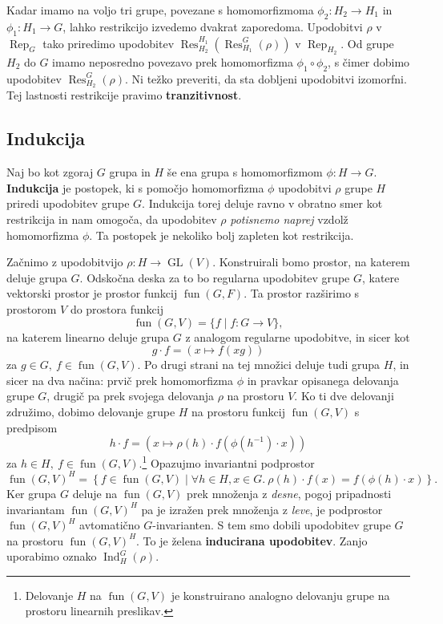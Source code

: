 \documentclass[11pt]{book}
\DeclareMathOperator\Res{Res}
\DeclareMathOperator\Ind{Ind}
\DeclareMathOperator\Rep{Rep}
\DeclareMathOperator\fun{fun}
\DeclareMathOperator\GL{GL}
\def\definicija{\color{rdeca}\bf}
\theoremstyle{definition}
\theoremstyle{zgled}
\theoremstyle{zgledbrezstevilke}
\theoremstyle{odprtproblem}
\theoremstyle{domacanaloga}
\theoremstyle{izrek}
\begin{document}
Kadar imamo na voljo tri grupe, povezane s homomorfizmoma $\phi_2 \colon H_2 \to H_1$ in $\phi_1 \colon H_1 \to G$, lahko restrikcijo izvedemo dvakrat zaporedoma. Upodobitvi $\rho$ v $\Rep_G$ tako priredimo upodobitev $\Res^{H_1}_{H_2}(\Res^G_{H_1}(\rho))$ v $\Rep_{H_2}$. Od grupe $H_2$ do $G$ imamo neposredno povezavo prek homomorfizma $\phi_1 \circ \phi_2$, s čimer dobimo upodobitev $\Res^G_{H_2}(\rho)$. Ni težko preveriti, da sta dobljeni upodobitvi izomorfni. Tej lastnosti restrikcije pravimo {\definicija tranzitivnost}.

\subsection{Indukcija}

Naj bo kot zgoraj $G$ grupa in $H$ še ena grupa s homomorfizmom $\phi \colon H \to G$. {\definicija Indukcija} je postopek, ki s pomočjo homomorfizma $\phi$ upodobitvi $\rho$ grupe $H$ priredi upodobitev grupe $G$. Indukcija torej deluje ravno v obratno smer kot restrikcija in nam omogoča, da upodobitev $\rho$ \emph{potisnemo naprej} vzdolž homomorfizma $\phi$. Ta postopek je nekoliko bolj zapleten kot restrikcija.

Začnimo z upodobitvijo $\rho \colon H \to \GL(V)$. Konstruirali bomo prostor, na katerem deluje grupa $G$. Odskočna deska za to bo regularna upodobitev grupe $G$, katere vektorski prostor je prostor funkcij $\fun(G,F)$. Ta prostor razširimo s prostorom $V$ do prostora funkcij
\[
    \fun(G,V) = \{ f \mid f \colon G \to V \},
\]
na katerem linearno deluje grupa $G$ z analogom regularne upodobitve, in sicer kot
\[
    g \cdot f = \left( x \mapsto f(xg) \right)
\]
za $g \in G, \ f \in \fun(G,V)$. Po drugi strani na tej množici deluje tudi grupa $H$, in sicer na dva načina: prvič prek homomorfizma $\phi$ in pravkar opisanega delovanja grupe $G$, drugič pa prek svojega delovanja $\rho$ na prostoru $V$. Ko ti dve delovanji združimo, dobimo delovanje grupe $H$ na prostoru funkcij
$\fun(G,V)$ s predpisom
\[
    h \cdot f = \left( x \mapsto \rho(h) \cdot f \left( \phi(h^{-1}) \cdot x \right) \right)
\]
za $h \in H, \ f \in \fun(G,V)$.\footnote{Delovanje $H$ na $\fun(G,V)$ je konstruirano analogno delovanju grupe na prostoru linearnih preslikav.} Opazujmo invariantni podprostor
\[
    \fun(G, V)^H =
    \left\{ f \in \fun(G,V) \mid \forall h \in H, x \in G. \ \rho(h) \cdot f(x) = f \left(\phi(h) \cdot x\right)\right\}.
\]
Ker grupa $G$ deluje na $\fun(G,V)$ prek množenja z \emph{desne}, pogoj pripadnosti invariantam $\fun(G,V)^H$ pa je izražen prek množenja z \emph{leve}, je podprostor $\fun(G,V)^H$ avtomatično $G$-invarianten. S tem smo dobili upodobitev grupe $G$ na prostoru $\fun(G,V)^H$. To je želena {\definicija inducirana upodobitev}. Zanjo uporabimo oznako $\Ind^G_H(\rho)$.
\end{document}
